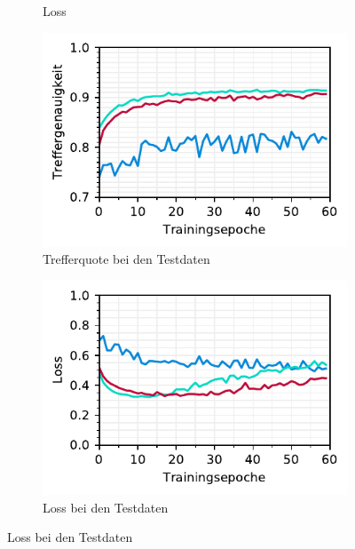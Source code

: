 \begin{figure}[h!]
\begin{subfigure}[b]{0.5\linewidth}
    \caption{Loss} 
    \label{image-class-results:b} 
    \vspace{2ex}
  \end{subfigure} 
  \begin{subfigure}[b]{0.5\linewidth}
    \centering
    \includegraphics[scale=1]{graphics/matplot/img-class__val_acc.pdf}
    \caption{Trefferquote bei den Testdaten} 
    \label{image-class-results:c} 
  \end{subfigure}%
  \begin{subfigure}[b]{0.5\linewidth}
    \centering
    \includegraphics[scale=1]{graphics/matplot/img-class__val_loss.pdf}
    \caption{Loss bei den Testdaten} 
    \label{image-class-results:d} 
  \end{subfigure}
  \centering
\end{figure}


